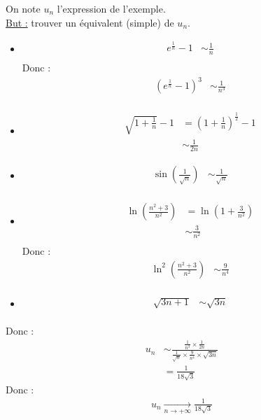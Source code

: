 \documentclass[../main.tex]{subfiles}
\begin{document}
\noindent On note $u_n$ l'expression de l'exemple. \\
\underline{But :} trouver un équivalent (simple) de $u_n$. \\
\begin{itemize}
    \item \begin{align*}
        e^{\frac{1}{n}} - 1 &\sim \frac{1}{n} \\
    \end{align*}
    Donc : 
    \begin{align*}
        (e^{\frac{1}{n}} - 1)^3 &\sim \frac{1}{n^3} \\	
    \end{align*}

    \item \begin{align*}
        \sqrt{1+\frac{1}{n}} - 1 &= (1 + \frac{1}{n})^{\frac{1}{2}} - 1 \\
        &\sim \frac{1}{2n} 
    \end{align*}

    \item \begin{align*}
        \sin\left(\frac{1}{\sqrt{n}}\right) &\sim \frac{1}{\sqrt{n}} \\
    \end{align*}

    \item \begin{align*}
        \ln\left(\frac{n^2+3}{n^2}\right) &= \ln\left(1 + \frac{3}{n^2}\right) \\
        &\sim \frac{3}{n^2} \\
    \end{align*}
    Donc : 
    \begin{align*}
        \ln^2\left(\frac{n^2+3}{n^2}\right) &\sim \frac{9}{n^4} \\
    \end{align*}
    
    \item \begin{align*}
        \sqrt{3n+1} &\sim \sqrt{3n} \\
    \end{align*}
\end{itemize}
Donc : 
\begin{align*}
    u_n &\sim \frac{\frac{1}{n^3} \times \frac{1}{2n}}{\frac{1}{\sqrt{n}} \times \frac{9}{n^4} \times \sqrt{3n}} \\
    &= \frac{1}{18 \sqrt{3}}
\end{align*}
Donc : 
\begin{align*}
    u_n \underset{n \to +\infty}{\longrightarrow} \frac{1}{18 \sqrt{3}}
\end{align*}
\end{document}
